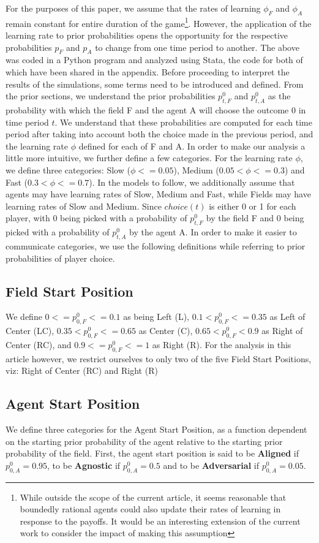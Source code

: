 \documentclass[12pt,letterpaper]{article}
\begin{document}
For the purposes of this paper, we assume that the rates of learning $\phi_F$ and $\phi_A$ remain constant for entire duration of the game\footnote{While outside the scope of the current article, it seems reasonable that boundedly rational agents could also update their rates of learning in response to the payoffs. It would be an interesting extension of the current work to consider the impact of making this assumption}. However, the application of the learning rate to prior probabilities opens the opportunity for the respective probabilities $p_F$ and $p_A$ to change from one time period to another. The above was coded in a Python program and analyzed using Stata, the code for both of which have been shared in the appendix.
Before proceeding to interpret the results of the simulations, some terms need to be introduced and defined. From the prior sections, we understand the prior probabilities $p_{t,F}^0$ and $p_{t,A}^0$ as the probability with which the field F and the agent A will choose the outcome 0 in time period $t$. We understand that these probabilities are computed for each time period after taking into account both the choice made in the previous period, and the learning rate $\phi$ defined for each of F and A. 
In  order to make our analysis a little more intuitive, we further define a few categories. For the learning rate $\phi$, we define three categories: Slow ($\phi <= 0.05$), Medium ($0.05 < \phi <= 0.3$) and Fast  ($0.3 < \phi <= 0.7$). In the models to follow, we additionally assume that agents may have learning rates of Slow, Medium and Fast, while Fields may have learning rates of Slow and Medium. Since $choice(t)$ is either 0 or 1 for each player, with 0 being picked with a probability of $p_{t,F}^0$ by the field F and 0 being picked with a probability of $p_{t,A}^0$ by the agent A. In order to make it easier to communicate categories, we use the following definitions while referring to prior probabilities of player choice. 
\subsection{Field Start Position}
\indent We define $0 <= p_{0,F}^0 <= 0.1$ as being Left (L),  $0.1 < p_{0,F}^0 <= 0.35$ as Left of Center (LC), $0.35 < p_{0,F}^0 <= 0.65$ as Center (C),  $0.65 < p_{0,F}^0 < 0.9$ as  Right of Center (RC), and $0.9 <= p_{0,F}^0 <= 1$ as Right (R). For the analysis in this article however, we restrict ourselves to only two of the five Field Start Positions, viz: Right of Center (RC) and Right (R)
\subsection{Agent Start Position}
\indent We define three categories for the Agent Start Position, as a function dependent on the starting prior probability of the agent relative to the starting prior probability of the field. First, the agent start position is said to be \textbf{Aligned} if $p_{0,A}^0 = 0.95$, to be \textbf{Agnostic} if $p_{0,A}^0 = 0.5$ and to be \textbf{Adversarial} if $p_{0,A}^0 = 0.05$. 
\end{document}

